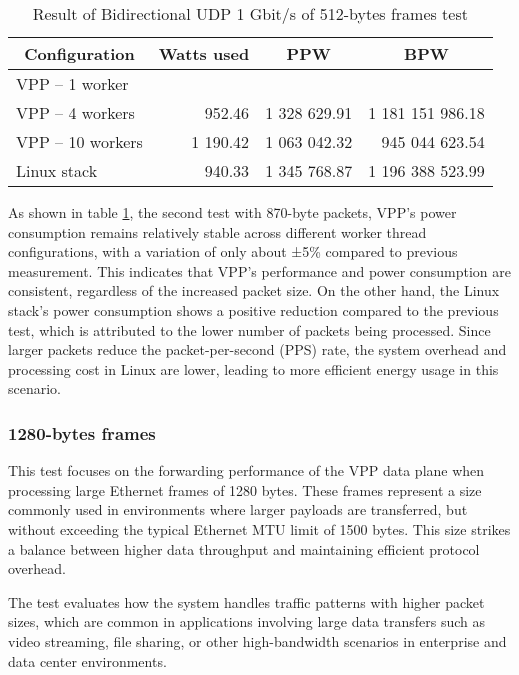 \begin{table}[h!]
\centering
\begin{tabular}{|l|r|r|r|}
\hline
\multicolumn{1}{|c|}{\textbf{Configuration}} &
\multicolumn{1}{c|}{\textbf{Watts used}} &
\multicolumn{1}{c|}{\textbf{PPW}} &
\multicolumn{1}{c|}{\textbf{BPW}} \\
\hline
VPP -- 1 worker &  &  &  \\
VPP -- 4 workers & 952.46 & 1 328 629.91 & 1 181 151 986.18 \\
VPP -- 10 workers & 1 190.42 & 1 063 042.32 & 945 044 623.54 \\
Linux stack & 940.33 & 1 345 768.87 & 1 196 388 523.99 \\
\hline
\end{tabular}
\caption{Result of Bidirectional UDP 1 Gbit/s of 512-bytes frames test}
\label{tab:udp:two}
\end{table}

As shown in table \ref{tab:udp:two}, the second test with 870-byte packets, 
VPP's power consumption remains relatively stable across different worker thread configurations, with a variation of only about ±5\% compared to previous measurement. 
This indicates that VPP's performance and power consumption are consistent, regardless of the increased packet size. 
On the other hand, the Linux stack's power consumption shows a positive reduction compared to the previous test, which is attributed to the lower number of packets being processed. 
Since larger packets reduce the packet-per-second (PPS) rate, the system overhead and processing cost in Linux are lower, leading to more efficient energy usage in this scenario.

\subsubsection{1280-bytes frames}
This test focuses on the forwarding performance of the VPP data plane when processing large Ethernet frames of 1280 bytes. 
These frames represent a size commonly used in environments where larger payloads are transferred, but without exceeding the typical Ethernet MTU limit of 1500 bytes. 
This size strikes a balance between higher data throughput and maintaining efficient protocol overhead.

The test evaluates how the system handles traffic patterns with higher packet sizes, which are common in applications involving large data transfers such as video streaming, 
file sharing, or other high-bandwidth scenarios in enterprise and data center environments.

